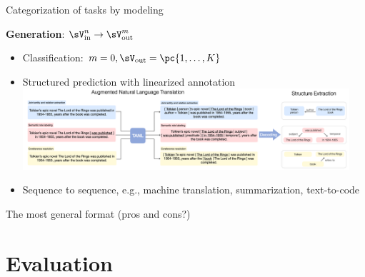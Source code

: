 \documentclass[usenames,dvipsnames,notes,11pt,aspectratio=169,hyperref={colorlinks=true, linkcolor=blue}]{beamer}
\begin{document}
\begin{frame}
    {Categorization of tasks by modeling}

    \textbf{Generation}: $\sV_{\text{in}}^n \rightarrow \sV_{\text{out}}^m$\\
    \begin{itemize}
        \item Classification: $m=0, \sV_{\text{out}}=\pc{1,\ldots,K}$
        \item Structured prediction with linearized annotation\\[1ex]
            \includegraphics[height=3cm]{figures/tanl}
        \item Sequence to sequence, e.g., machine translation, summarization, text-to-code
    \end{itemize}

    The most general format (pros and cons?)
\end{frame}

\section{Evaluation}
\end{document}
